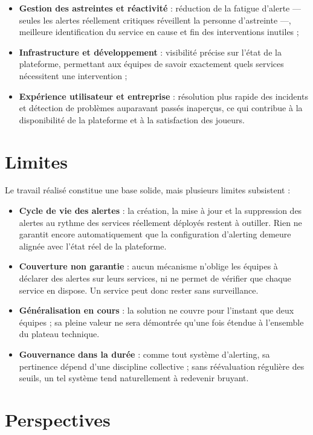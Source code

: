 \begin{itemize}
	\item \textbf{Gestion des astreintes et réactivité} : réduction de la fatigue d'alerte — seules les alertes réellement critiques réveillent la personne d'astreinte —, meilleure identification du service en cause et fin des interventions inutiles ;
	\item \textbf{Infrastructure et développement} : visibilité précise sur l'état de la plateforme, permettant aux équipes de savoir exactement quels services nécessitent une intervention ;
	\item \textbf{Expérience utilisateur et entreprise} : résolution plus rapide des incidents et détection de problèmes auparavant passés inaperçus, ce qui contribue à la disponibilité de la plateforme et à la satisfaction des joueurs.
\end{itemize}

\section{Limites}

Le travail réalisé constitue une base solide, mais plusieurs limites subsistent :

\begin{itemize}
	\item \textbf{Cycle de vie des alertes} : la création, la mise à jour et la suppression des alertes au rythme des services réellement déployés restent à outiller. Rien ne garantit encore automatiquement que la configuration d'alerting demeure alignée avec l'état réel de la plateforme.
	\item \textbf{Couverture non garantie} : aucun mécanisme n'oblige les équipes à déclarer des alertes sur leurs services, ni ne permet de vérifier que chaque service en dispose. Un service peut donc rester sans surveillance.
	\item \textbf{Généralisation en cours} : la solution ne couvre pour l'instant que deux équipes ; sa pleine valeur ne sera démontrée qu'une fois étendue à l'ensemble du plateau technique.
	\item \textbf{Gouvernance dans la durée} : comme tout système d'alerting, sa pertinence dépend d'une discipline collective ; sans réévaluation régulière des seuils, un tel système tend naturellement à redevenir bruyant.
\end{itemize}

\section{Perspectives}

